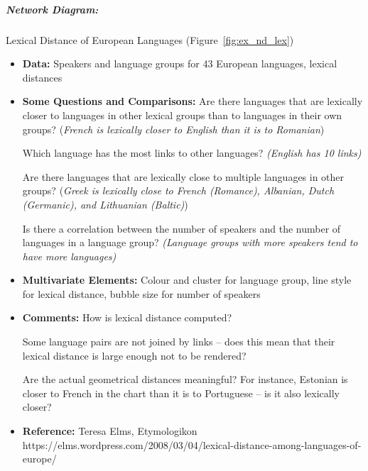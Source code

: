 \afterpage{\FloatBarrier}
\subparagraph{Network Diagram:} Lexical Distance of European Languages (Figure~\ref{fig:ex_nd_lex})
\begin{itemize}[noitemsep]
\item \textbf{Data:} Speakers and language groups for 43 European languages, lexical distances 
\item \textbf{Some Questions and Comparisons:} Are there languages that are lexically closer to languages in other lexical groups than to languages in their own groups? (\textit{French is lexically closer to English than it is to Romanian})\par Which language has the most links to other languages? \textit{(English has 10 links)} \par Are there languages that are lexically close to multiple languages in other groups? (\textit{Greek is lexically close to French (Romance), Albanian, Dutch (Germanic), and Lithuanian (Baltic)}) \par Is there a correlation between the number of speakers and the number of languages in a language group? \textit{(Language groups with more speakers tend to have more languages)}      
\item \textbf{Multivariate Elements:} Colour and cluster for language group, line style for lexical distance, bubble size for number of speakers
\item \textbf{Comments:} How is lexical distance computed?  \par Some language pairs are not joined by links -- does this mean that their lexical distance is large enough not to be rendered? \par Are the actual geometrical distances meaningful? For instance, Estonian is closer to French in the chart than it is to Portuguese -- is it also lexically closer? 
\item \textbf{Reference:} Teresa Elms, Etymologikon \\  https://elms.wordpress.com/2008/03/04/lexical-distance-among-languages-of-europe/ 
\end{itemize}

